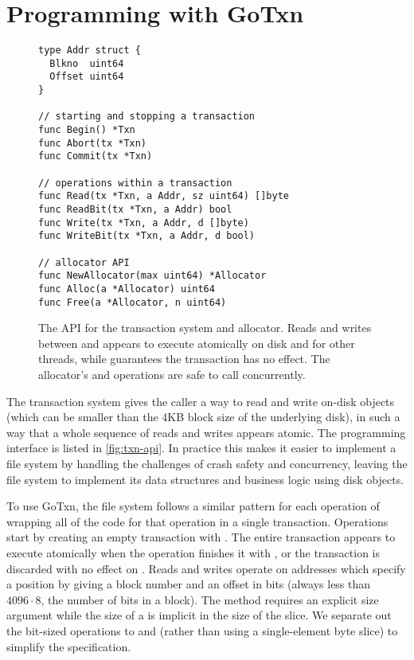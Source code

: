\section{Programming with GoTxn}
\label{s:gotxn-api}

\begin{figure}
\begin{verbatim}
type Addr struct {
  Blkno  uint64
  Offset uint64
}

// starting and stopping a transaction
func Begin() *Txn
func Abort(tx *Txn)
func Commit(tx *Txn)

// operations within a transaction
func Read(tx *Txn, a Addr, sz uint64) []byte
func ReadBit(tx *Txn, a Addr) bool
func Write(tx *Txn, a Addr, d []byte)
func WriteBit(tx *Txn, a Addr, d bool)

// allocator API
func NewAllocator(max uint64) *Allocator
func Alloc(a *Allocator) uint64
func Free(a *Allocator, n uint64)
\end{verbatim}
  \caption{The API for the transaction system and allocator. Reads and writes
    between  and  appears to execute atomically on disk and
    for other threads, while  guarantees the transaction has no
    effect. The allocator's  and  operations are safe to call
    concurrently.}
\label{fig:txn-api}
\end{figure}

The transaction system gives the caller a way to read and write on-disk
objects (which can be smaller than the 4KB block size of the underlying disk),
in such a way that a whole sequence of reads and writes appears atomic. The
programming interface is listed in \autoref{fig:txn-api}. In practice this makes
it easier to implement a file system by handling the challenges of crash safety
and concurrency, leaving the file system to implement its data structures and
business logic using disk objects.

To use GoTxn, the file system follows a similar pattern for each operation of
wrapping all of the code for that operation in a single transaction. Operations
start by creating an empty transaction with .
The entire
transaction appears to execute atomically when the operation finishes it
with , or the transaction is discarded with no effect on
. Reads and writes operate on addresses which specify a
position by giving a block number and an offset in bits (always less
than $4096 \cdot 8$, the number of bits in a block). The 
method requires an explicit size argument while the size of a
 is implicit in the size of the  slice. We separate
out the bit-sized operations to  and  (rather
than using a single-element byte slice) to simplify the specification.

